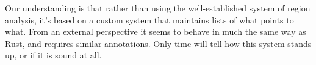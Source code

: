 Our understanding is that rather than using the well-established system of
region analysis, it's based on a custom system that maintains lists of what
points to what. From an external perspective it seems to behave in much the
same way as Rust, and requires similar annotations. Only time will tell how
this system stands up, or if it is sound at all.
















